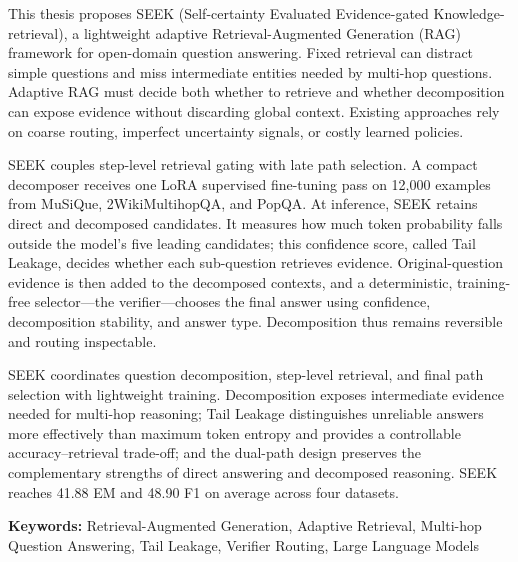 This thesis proposes SEEK (Self-certainty Evaluated Evidence-gated Knowledge-retrieval), a lightweight adaptive Retrieval-Augmented Generation (RAG) framework for open-domain question answering. Fixed retrieval can distract simple questions and miss intermediate entities needed by multi-hop questions. Adaptive RAG must decide both whether to retrieve and whether decomposition can expose evidence without discarding global context. Existing approaches rely on coarse routing, imperfect uncertainty signals, or costly learned policies.

SEEK couples step-level retrieval gating with late path selection. A compact decomposer receives one LoRA supervised fine-tuning pass on 12,000 examples from MuSiQue, 2WikiMultihopQA, and PopQA. At inference, SEEK retains direct and decomposed candidates. It measures how much token probability falls outside the model's five leading candidates; this confidence score, called Tail Leakage, decides whether each sub-question retrieves evidence. Original-question evidence is then added to the decomposed contexts, and a deterministic, training-free selector---the verifier---chooses the final answer using confidence, decomposition stability, and answer type. Decomposition thus remains reversible and routing inspectable.

SEEK coordinates question decomposition, step-level retrieval, and final path selection with lightweight training. Decomposition exposes intermediate evidence needed for multi-hop reasoning; Tail Leakage distinguishes unreliable answers more effectively than maximum token entropy and provides a controllable accuracy--retrieval trade-off; and the dual-path design preserves the complementary strengths of direct answering and decomposed reasoning. SEEK reaches 41.88 EM and 48.90 F1 on average across four datasets.

\bigskip
\noindent\textbf{Keywords:} Retrieval-Augmented Generation, Adaptive Retrieval, Multi-hop Question Answering, Tail Leakage, Verifier Routing, Large Language Models
